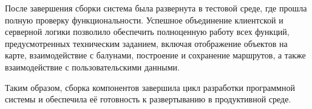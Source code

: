 После завершения сборки система была развернута в тестовой среде, где прошла полную проверку функциональности. Успешное объединение клиентской и серверной логики позволило обеспечить полноценную работу всех функций, предусмотренных техническим заданием, включая отображение объектов на карте, взаимодействие с балунами, построение и сохранение маршрутов, а также взаимодействие с пользовательскими данными.

Таким образом, сборка компонентов завершила цикл разработки программной системы и обеспечила её готовность к развертыванию в продуктивной среде.
